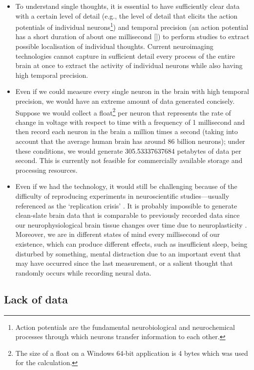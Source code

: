 \begin{itemize}
  \item To understand single thoughts, it is essential to have sufficiently clear data with a certain level of detail (e.g., the level of detail that elicits the action potentials of individual neurons\footnote{Action potentials are the fundamental neurobiological and neurochemical processes through which neurons transfer information to each other.}) and temporal precision (an action potential has a short duration of about one millisecond [\cite{byrne_resting_2021}]) to perform studies to extract possible localisation of individual thoughts. Current neuroimaging technologies cannot capture in sufficient detail every process of the entire brain at once to extract the activity of individual neurons while also having high temporal precision.
  \item Even if we could measure every single neuron in the brain with high temporal precision, we would have an extreme amount of data generated concisely. Suppose we would collect a float\footnote{The size of a float on a Windows 64-bit application is 4 bytes which was used for the calculation.} per neuron that represents the rate of change in voltage with respect to time with a frequency of 1 millisecond and then record each neuron in the brain a million times a second (taking into account that the average human brain has around 86 billion neurons); under these conditions, we would generate 305.53337637684 petabytes of data per second. This is currently not feasible for commercially available storage and processing resources.
  \item Even if we had the technology, it would still be challenging because of the difficulty of reproducing experiments in neuroscientific studies—usually referenced as the ‘replication crisis’ \citep{maxwell_is_2015}. It is probably impossible to generate clean-slate brain data that is comparable to previously recorded data since our neurophysiological brain tissue changes over time due to neuroplasticity \citep{nierhaus_immediate_2021}. Moreover, we are in different states of mind every millisecond of our existence, which can produce different effects, such as insufficient sleep, being disturbed by something, mental distraction due to an important event that may have occurred since the last measurement, or a salient thought that randomly occurs while recording neural data.
\end{itemize}

\subsection{Lack of data}
\label{chapter2-lack-of-data}

